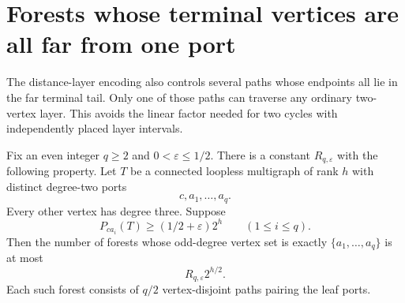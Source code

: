 \section{Forests whose terminal vertices are all far from one port}
\label{sec:far-terminal-return-forests}

The distance-layer encoding also controls several paths whose endpoints all lie in the far terminal tail.
Only one of those paths can traverse any ordinary two-vertex layer.
This avoids the linear factor needed for two cycles with independently placed layer intervals.

\begin{theorem}
\label{thm:far-terminal-forests}
Fix an even integer $q\ge2$ and $0<\varepsilon\le1/2$.
There is a constant $R_{q,\varepsilon}$ with the following property.
Let $T$ be a connected loopless multigraph of rank $h$ with distinct degree-two ports
\[
 c,a_1,\ldots,a_q.
\]
Every other vertex has degree three.
Suppose
\[
 P_{ca_i}(T)\ge(1/2+\varepsilon)2^h
 \qquad(1\le i\le q).
\]
Then the number of forests whose odd-degree vertex set is exactly $\{a_1,\ldots,a_q\}$ is at most
\[
 R_{q,\varepsilon}2^{h/2}.
\]
Each such forest consists of $q/2$ vertex-disjoint paths pairing the leaf ports.
\end{theorem}

